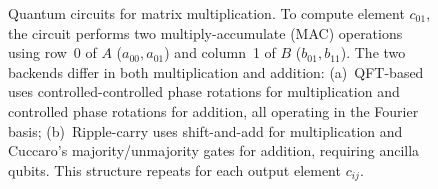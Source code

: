 \begin{figure}[t]
\caption{Quantum circuits for matrix multiplication. To compute element $c_{01}$, the circuit performs two multiply-accumulate (MAC) operations using row~0 of $A$ ($a_{00}, a_{01}$) and column~1 of $B$ ($b_{01}, b_{11}$). The two backends differ in both multiplication and addition: (a)~QFT-based uses controlled-controlled phase rotations for multiplication and controlled phase rotations for addition, all operating in the Fourier basis; (b)~Ripple-carry uses shift-and-add for multiplication and Cuccaro's majority/unmajority gates for addition, requiring ancilla qubits. This structure repeats for each output element $c_{ij}$.}
\label{fig:matmul-circuits}
\end{figure}
